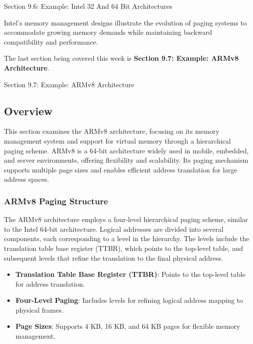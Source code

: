 \begin{notes}{Section 9.6: Example: Intel 32 And 64 Bit Architectures}
\begin{highlight}
    Intel's memory management designs illustrate the evolution of paging systems to accommodate growing memory demands while maintaining backward compatibility and performance.
    
    \end{highlight}
\end{notes}

The last section being covered this week is \textbf{Section 9.7: Example: ARMv8 Architecture}.

\begin{notes}{Section 9.7: Example: ARMv8 Architecture}
    \subsection*{Overview}

    This section examines the ARMv8 architecture, focusing on its memory management system and support for virtual memory through a hierarchical paging scheme. ARMv8 is a 64-bit architecture widely used 
    in mobile, embedded, and server environments, offering flexibility and scalability. Its paging mechanism supports multiple page sizes and enables efficient address translation for large address spaces.
    
    \subsubsection*{ARMv8 Paging Structure}
    
    The ARMv8 architecture employs a four-level hierarchical paging scheme, similar to the Intel 64-bit architecture. Logical addresses are divided into several components, each corresponding to a level 
    in the hierarchy. The levels include the translation table base register (TTBR), which points to the top-level table, and subsequent levels that refine the translation to the final physical address.
    
    \begin{highlight}
    
        \begin{itemize}
            \item \textbf{Translation Table Base Register (TTBR)}: Points to the top-level table for address translation.
            \item \textbf{Four-Level Paging}: Includes levels for refining logical address mapping to physical frames.
            \item \textbf{Page Sizes}: Supports 4 KB, 16 KB, and 64 KB pages for flexible memory management.
        \end{itemize}
    

\end{highlight}
\end{notes}
